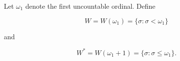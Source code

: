 Let $\omega_1$ denote the first uncountable ordinal. Define

$$W = W(\omega_1) = \{\sigma : \sigma < \omega_1\}$$

and

$$W^* = W(\omega_1 + 1) = \{\sigma : \sigma \leq \omega_1\}.$$
